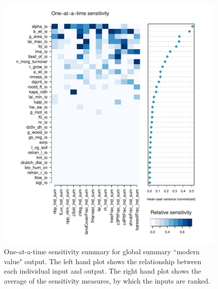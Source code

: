 \documentclass[gmd, manuscript]{copernicus}
\begin{document}
\begin{figure}[t]
\includegraphics[width=12cm]{./figs/fig07.pdf}
\caption{One-at-a-time sensitivity summary for global summary ``modern value" output. The left hand plot shows the relationship between each individual input and output. The right hand plot shows the average of the sensitivity measures, by which the inputs are ranked. }
\label{fig:oat_var_sensmat_level1a_wave01_Y}
\end{figure}
\end{document}

